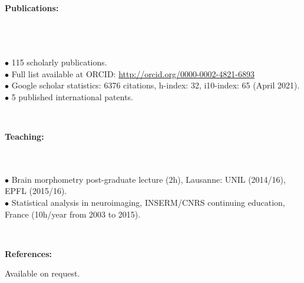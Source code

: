 \documentclass[english,10pt,a4paper]{scrartcl}
\begin{document}
\ \\
\noindent 
\begin{minipage}{.15\textwidth}
\textbf{Publications:}
\ \\ 
\ \\
\ \\
\ \\
\end{minipage}
\begin{minipage}{.85\textwidth}
{\tiny$\bullet$} 115 scholarly publications.\\
{\tiny$\bullet$} Full list available at ORCID: \url{http://orcid.org/0000-0002-4821-6893} \\
{\tiny$\bullet$} Google scholar statistics: 6376 citations, h-index: 32, i10-index: 65 (April 2021).\\
{\tiny$\bullet$} 5 published international patents. \\
\end{minipage}



\ \\
\noindent 
\begin{minipage}{.15\textwidth}
\textbf{Teaching:}
\ \\ 
\ \\
\  \\
\end{minipage}
\begin{minipage}{.85\textwidth}
{\tiny$\bullet$} Brain morphometry post-graduate lecture (2h), Lausanne: UNIL (2014/16), EPFL (2015/16).\\
{\tiny$\bullet$} Statistical analysis in neuroimaging, INSERM/CNRS continuing education, France (10h/year from 2003 to 2015).\\
\end{minipage}


\ \\
\noindent 
\begin{minipage}{.15\textwidth}
\textbf{References:}
\end{minipage}
\begin{minipage}{.85\textwidth}
Available on request.
\end{minipage}

%
\end{document}

